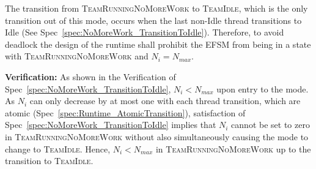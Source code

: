 \documentclass{article}
\newcommand{\TeamIdle}          {\textsc{TeamIdle}}
\newcommand{\TeamRunningNoMoreWork} {\textsc{TeamRunningNoMoreWork}}
\begin{document}
\begin{spec}
\label{spec:NoMoreWork_NeedThread}
The transition from {\TeamRunningNoMoreWork} to \TeamIdle, which is the only
transition out of this mode, occurs when the last non-Idle thread transitions to
Idle (See Spec~\ref{spec:NoMoreWork_TransitionToIdle}).  Therefore, to avoid
deadlock the design of the runtime shall prohibit the EFSM from being in a state
with {\TeamRunningNoMoreWork} and $N_i = N_{max}$.
\end{spec}
\textbf{Verification:}\hspace{0.125in} As shown in the Verification of
Spec~\ref{spec:NoMoreWork_TransitionToIdle},  $N_i < N_{max}$ upon entry to the
mode.  As $N_i$ can only decrease by at most one with each thread transition,
which are atomic (Spec~\ref{spec:Runtime_AtomicTransition}), satisfaction of
Spec~\ref{spec:NoMoreWork_TransitionToIdle} implies that $N_i$ cannot be set to
zero in {\TeamRunningNoMoreWork} without also simultaneously causing the mode to
change to \TeamIdle.  Hence, $N_i < N_{max}$ in {\TeamRunningNoMoreWork} up to
the transition to \TeamIdle.



\end{document}
